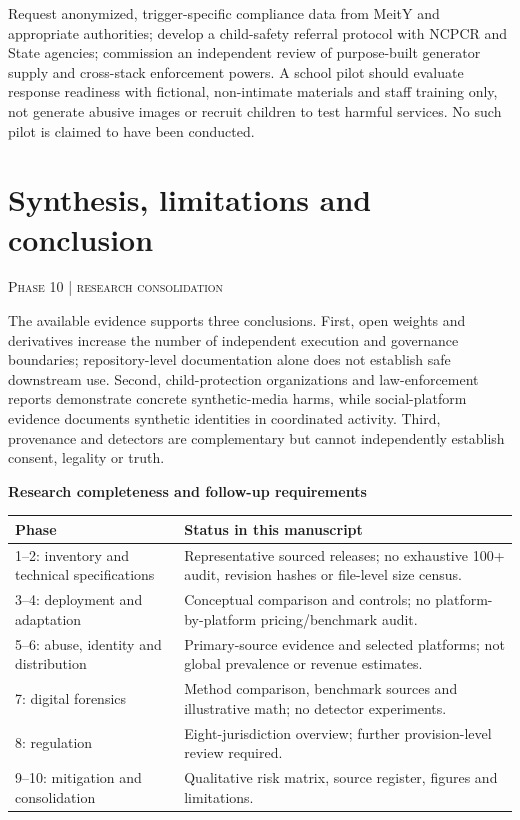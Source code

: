 \documentclass[10pt,a4paper]{article}
\newcommand{\sect}[2]{\Needspace{6\baselineskip}\section{#1}\textcolor{muted}{\small\textsc{#2}}\par\vspace{2mm}}
\newcommand{\sub}[1]{\vspace{1mm}\textbf{#1}\par}
\begin{document}
Request anonymized, trigger-specific compliance data from MeitY and appropriate authorities; develop a child-safety referral protocol with NCPCR and State agencies; commission an independent review of purpose-built generator supply and cross-stack enforcement powers. A school pilot should evaluate response readiness with fictional, non-intimate materials and staff training only, not generate abusive images or recruit children to test harmful services. No such pilot is claimed to have been conducted.

\sect{Synthesis, limitations and conclusion}{Phase 10 | research consolidation}

The available evidence supports three conclusions. First, open weights and derivatives increase the number of independent execution and governance boundaries; repository-level documentation alone does not establish safe downstream use. Second, child-protection organizations and law-enforcement reports demonstrate concrete synthetic-media harms, while social-platform evidence documents synthetic identities in coordinated activity. Third, provenance and detectors are complementary but cannot independently establish consent, legality or truth. \cite{hfcards,iwf,ncmec25,fbi,meta,nist,c2pa}


\sub{Research completeness and follow-up requirements}

\begin{center}\small\begin{tabularx}{\linewidth}{@{}YY@{}}\toprule
\textbf{Phase} & \textbf{Status in this manuscript}\\--2: inventory and technical specifications & Representative sourced releases; no exhaustive 100+ audit, revision hashes or file-level size census.\\
3--4: deployment and adaptation & Conceptual comparison and controls; no platform-by-platform pricing/benchmark audit.\\
5--6: abuse, identity and distribution & Primary-source evidence and selected platforms; not global prevalence or revenue estimates.\\
7: digital forensics & Method comparison, benchmark sources and illustrative math; no detector experiments.\\
8: regulation & Eight-jurisdiction overview; further provision-level review required.\\
9--10: mitigation and consolidation & Qualitative risk matrix, source register, figures and limitations.\\\bottomrule\end{tabularx}\end{center}
\end{document}
